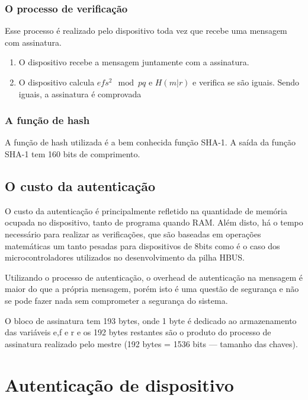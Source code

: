 \subsubsection{O processo de verificação}

Esse processo é realizado pelo dispositivo toda vez que recebe uma mensagem com assinatura.

\begin{enumerate}

\item O dispositivo recebe a mensagem juntamente com a assinatura.

\item O dispositivo calcula $efs^2 \mod{pq}$ e $H\left({}m|r\right)$ e verifica se são iguais. Sendo iguais, a assinatura é comprovada

\end{enumerate}

\subsubsection{A função de hash}

A função de hash utilizada é a bem conhecida função SHA-1. A saída da função SHA-1 tem 160 bits de comprimento.

\subsection{O custo da autenticação}

O custo da autenticação é principalmente refletido na quantidade de memória ocupada no dispositivo, tanto de programa quando RAM. Além disto, há o tempo necessário para realizar as verificações, que são baseadas em operações matemáticas um tanto pesadas para dispositivos de 8bits como é o caso dos microcontroladores utilizados no desenvolvimento da pilha HBUS.

Utilizando o processo de autenticação, o overhead de autenticação na mensagem é maior do que a própria mensagem, porém isto é uma questão de segurança e não se pode fazer nada sem comprometer a segurança do sistema.

O bloco de assinatura tem 193 bytes, onde 1 byte é dedicado ao armazenamento das variáveis e,f e r e os 192 bytes restantes são o produto do processo de assinatura realizado pelo mestre (192 bytes = 1536 bits --- tamanho das chaves). 

\section{Autenticação de dispositivo}

